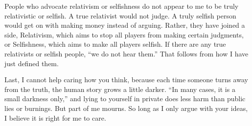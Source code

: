 People who advocate relativism or selfishness do not appear to me to be truly relativistic or selfish. A true relativist would not judge. A truly selfish person would get on with making money instead of arguing.  Rather, they have joined a side, Relativism, which aims to stop all players from making certain judgments, or Selfishness, which aims to make all players selfish. If there are any true relativists or selfish people, ``we do not hear them.'' That follows from how I have just defined them.

Last, I cannot help caring how you think, because each time someone turns away from the truth, the human story grows a little darker. ``In many cases, it is a small darkness only,'' and lying to yourself in private does less harm than public lies or burnings. But part of me mourns. So long as I only argue with your ideas, I believe it is right for me to care.
